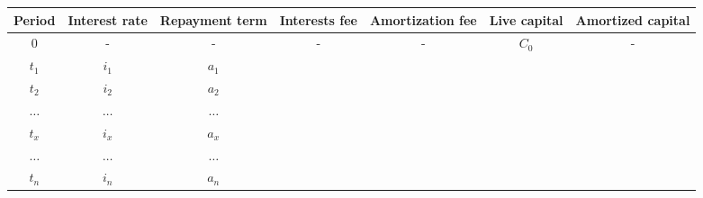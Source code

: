 \documentclass[10pt, a4paper]{extarticle}
\begin{document}
\begin{tabular}{|c|c|c|c|c|c|c|}
	\hline
	 Period  & Interest rate & Repayment term & Interests fee & Amortization fee & Live capital & Amortized capital \\ \hline
	  $0$    &       -       &       -        &       -       &        -         &    $C_0$     &         -         \\ \hline
	 $t_1$   &     $i_1$     &     $a_1$      &               &                  &              &                   \\ \hline
	 $t_2$   &     $i_2$     &     $a_2$      &               &                  &              &                   \\ \hline
	$\ldots$ &   $\ldots$    &    $\ldots$    &               &                  &              &                   \\ \hline
	 $t_x$   &     $i_x$     &     $a_x$      &               &                  &              &                   \\ \hline
	$\ldots$ &   $\ldots$    &    $\ldots$    &               &                  &              &                   \\ \hline
	 $t_n$   &     $i_n$     &     $a_n$      &               &                  &              &                   \\ \hline
\end{tabular}
\end{document}
